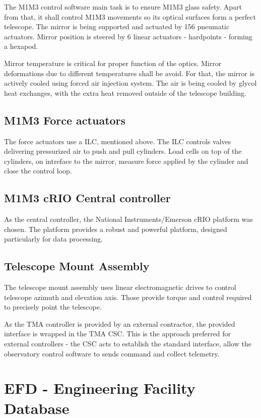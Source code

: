 \documentclass[proceedings, preprint]{rmaa}
\begin{document}
The M1M3 control software main task is to ensure M1M3 glass safety. Apart from
that, it shall control M1M3 movements so its optical surfaces form a perfect
telescope. The mirror is being supported and actuated by 156 pneumatic
actuators. Mirror position is steered by 6 linear actuators - hardpoints -
forming a hexapod.

Mirror temperature is critical for proper function of the optics. Mirror
deformations due to different temperatures shall be avoid. For that, the mirror
is actively cooled using forced air injection system. The air is being cooled
by glycol heat exchanges, with the extra heat removed outside of the telescope
building.

\subsection{M1M3 Force actuators}

The force actuators use a ILC, mentioned above. The ILC controls valves
delivering pressurized air to push and pull cylinders. Load cells on top of the
cylinders, on intreface to the mirror, measure force applied by the cylinder
and close the control loop.

\subsection{M1M3 cRIO Central controller}

As the central controller, the National Instruments/Emerson cRIO platform was
chosen. The platform provides a robust and powerful platform, designed
particularly for data processing.

\subsection{Telescope Mount Assembly}

The telescope mount assembly uses linear electromagnetic drives to control
telescope azimuth and elevation axis. Those provide torque and control required
to precisely point the telescope.

As the TMA controller is provided by an external contractor, the provided
interface is wrapped in the TMA CSC. This is the approach preferred for
external controllers - the CSC acts to establish the standard interface, allow
the observatory control software to sends command and collect telemetry.

\section{EFD - Engineering Facility Database}
\end{document}
